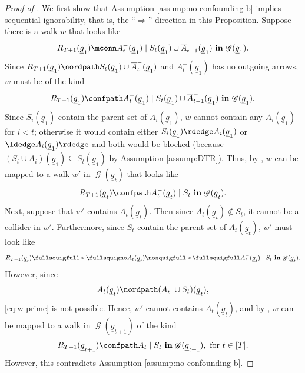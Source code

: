 \documentclass[12pt,a4paper]{article}
\theoremstyle{definition}
\newcommand{\ingraph}[1]{~\textnormal{\bf in}\,#1}
\DeclareMathOperator{\gG}{\mathscr{G}}
\begin{document}
\begin{proof}[Proof of ]
  We first show that Assumption \ref{assump:no-confounding-b} implies
  sequential ignorability, that is, the ``$\Rightarrow$''
  direction in this Proposition. Suppose there is a walk $w$ that looks like
  \[
      R_{T+1}(\underline{g}_1) \mconn A_t^{-}(\underline{g}_1) \mid
      S_t(\underline{g}_1) \cup
      \overline{A}^{-}_{t-1}(\underline{g}_1) \ingraph{\gG(\underline{g}_1)}.
  \]
  Since $R_{T+1}(\underline{g}_1) \nordpath S_t(\underline{g}_1) \cup \overline{A}^{-}_{t}(\underline{g}_1)$ and $A_t^{-}(\underline{g}_1)$ has no outgoing arrows, $w$ must be of the kind
  \[
      R_{T+1}(\underline{g}_1) \confpath A_t^{-}(\underline{g}_1) \mid
      S_t(\underline{g}_1) \cup
      \overline{A}^{-}_{t-1}(\underline{g}_1) \ingraph{\gG(\underline{g}_1)}.
  \]
  Since $S_i(\underline{g}_1)$
  contain the parent set of $A_i(\underline{g}_1)$, $w$ cannot contain
  any $A_i(\underline{g}_1)$ for $i < t$; otherwise it would contain
  either $S_i(\underline{g}_1) \rdedge A_i(\underline{g}_1)$ or
  $\ldedge A_i(\underline{g}_1) \rdedge$ and both would be
  blocked (because $(S_i \cup A_i)(\underline{g}_1) \subseteq
  S_t(\underline{g}_1)$ by Assumption \ref{assump:DTR}). Thus, by
  , $w$ can be mapped to a walk $w'$
  in $\gG(\underline{g}_t)$ that looks like
  \[
      R_{T+1}(\underline{g}_t) \confpath A_t^{-}(\underline{g}_t) \mid S_t
      \ingraph{\gG(\underline{g}_t)}.
  \]
  Next, suppose that $w'$ contains $A_t(\underline{g}_t)$. Then since $A_t(\underline{g}_t) \notin S_t$, it cannot be a collider in $w'$. Furthermore, since $S_t$ contain the parent set of $A_t(\underline{g}_t)$, $w'$ must look like
  \begin{equation}
    \label{eq:w-prime}
      R_{T+1}(\underline{g}_t) \fullsquigfull \ast \fullsquigno
      A_t(\underline{g}_t) \nosquigfull \ast \fullsquigfull
      A_t^{-}(\underline{g}_t)
      \mid S_t \ingraph{\gG(\underline{g}_t)}.
  \end{equation}
  However, since
  \[
      A_t(\underline{g}_t) \nordpath (A_t^{-}\cup S_t)(\underline{g}_t),
  \]
  \eqref{eq:w-prime} is not possible. Hence, $w'$ cannot contains $A_t(\underline{g}_t)$, and by , $w$ can be mapped to a walk in $\gG(\underline{g}_{t+1})$ of the kind
  \begin{equation}\label{eq:seq_ignorability_type_walk}
      R_{T+1}(\underline{g}_{t+1}) \confpath A_t \mid S_t \ingraph{\gG(\underline{g}_{t+1})}, ~ \text{for} ~ t\in [T].
  \end{equation}
  However, this contradicts Assumption \ref{assump:no-confounding-b}.


\end{proof}
\end{document}
